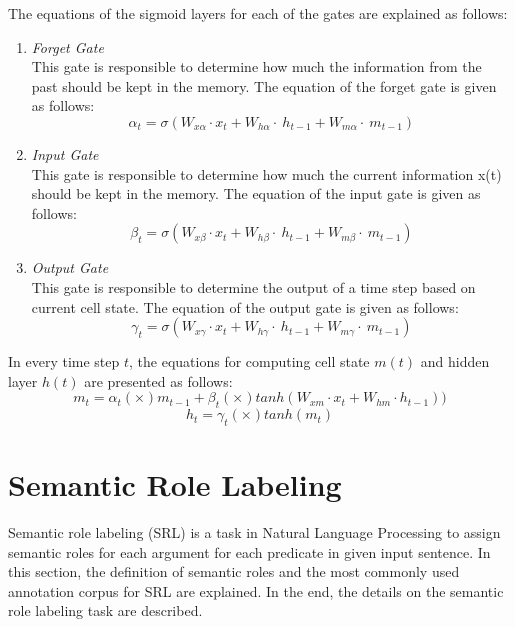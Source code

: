The equations of the sigmoid layers for each of the gates are explained as follows:
\begin{enumerate}
	\item \textit{Forget Gate}\\
	This gate is responsible to determine how much the information from the past should be kept in the memory. The equation of the forget gate is given as follows:
	\begin{equation}\label{eq:forget_lstm}
	\alpha_{t}=\sigma(W_{x\alpha}\cdot x_{t}+W_{h\alpha}\cdot~h_{t-1}+W_{m\alpha}\cdot~m_{t-1})
	\end{equation}
	
	\item \textit{Input Gate}\\
	This gate is responsible to determine how much the current information x(t) should be kept in the memory. The equation of the input gate is given as follows:
	\begin{equation}\label{eq:input_lstm}
	\beta_{t}=\sigma(W_{x\beta}\cdot x_{t}+W_{h\beta}\cdot~h_{t-1}+W_{m\beta}\cdot~m_{t-1})
	\end{equation}
	
	\item \textit{Output Gate}\\
	This gate is responsible to determine the output of a time step based on current cell state. The equation of the output gate is given as follows:
	\begin{equation}\label{eq:output_lstm}
	\gamma_{t}=\sigma(W_{x\gamma}\cdot x_{t}+W_{h\gamma}\cdot~h_{t-1}+W_{m\gamma}\cdot~m_{t-1})
	\end{equation}
	
\end{enumerate}

In every time step $t$, the equations for computing cell state $m(t)$ and hidden layer $h(t)$ are presented as follows:
\begin{equation}\label{eq:mt}
m_{t}=\alpha_{t} (\times) m_{t-1} + \beta_{t} (\times) tanh(W_{xm} \cdot x_{t} + W_{hm} \cdot h_{t-1}))
\end{equation}
\begin{equation}\label{eq:ht}
h_{t}=\gamma_{t} (\times) tanh(m_{t})
\end{equation}

\section{Semantic Role Labeling}
Semantic role labeling (SRL) is a task in Natural Language Processing to assign semantic roles for each argument for each predicate in given input sentence. In this section, the definition of semantic roles and the most commonly used annotation corpus for SRL are explained. In the end, the details on the semantic role labeling task are described.

